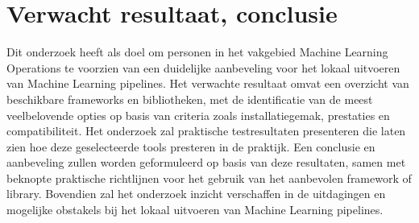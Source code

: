


\section{Verwacht resultaat, conclusie}%
\label{sec:verwachte_resultaten}
Dit onderzoek heeft als doel om personen in het vakgebied Machine Learning Operations te voorzien van een duidelijke aanbeveling voor het lokaal uitvoeren van Machine Learning pipelines. Het verwachte resultaat omvat een overzicht van beschikbare frameworks en bibliotheken, met de identificatie van de meest veelbelovende opties op basis van criteria zoals installatiegemak, prestaties en compatibiliteit. Het onderzoek zal praktische testresultaten presenteren die laten zien hoe deze geselecteerde tools presteren in de praktijk. Een conclusie en aanbeveling zullen worden geformuleerd op basis van deze resultaten, samen met beknopte praktische richtlijnen voor het gebruik van het aanbevolen framework of library. Bovendien zal het onderzoek inzicht verschaffen in de uitdagingen en mogelijke obstakels bij het lokaal uitvoeren van Machine Learning pipelines.



